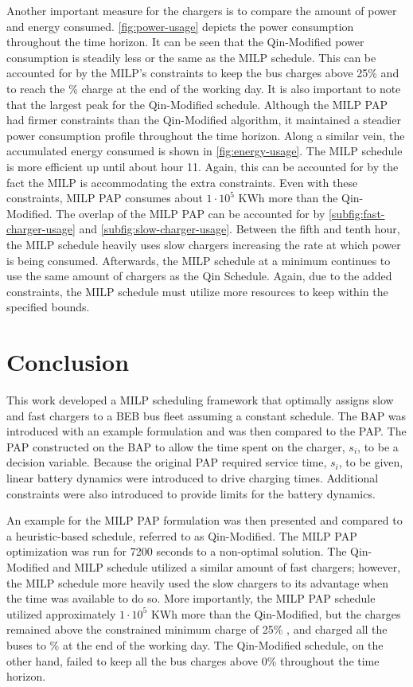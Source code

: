 \documentclass[utf8]{FrontiersinHarvard}
\newcommand{\bcharge}{0.7 }                                                     %
\newcommand{\mincharge}{25\% }                                                  %
\newcommand{\timeran}{7200 }                                                    %
\begin{document}
Another important measure for the chargers is to compare the amount of power and energy consumed.
\autoref{fig:power-usage} depicts the power consumption throughout the time horizon. It can be seen that the
Qin-Modified power consumption is steadily less or the same as the MILP schedule. This can be accounted for by the
MILP's constraints to keep the bus charges above \mincharge and to reach the \fpeval{\bcharge *100}\% charge at the end
of the working day. It is also important to note that the largest peak for the Qin-Modified schedule. Although the MILP
PAP had firmer constraints than the Qin-Modified algorithm, it maintained a steadier power consumption profile
throughout the time horizon. Along a similar vein, the accumulated energy consumed is shown in
\autoref{fig:energy-usage}. The MILP schedule is more efficient up until about hour 11. Again, this can be accounted for
by the fact the MILP is accommodating the extra constraints. Even with these constraints, MILP PAP consumes about
\(1\cdot10^5\) KWh more than the Qin-Modified. The overlap of the MILP PAP can be accounted for by
\autoref{subfig:fast-charger-usage} and \autoref{subfig:slow-charger-usage}. Between the fifth and tenth hour, the MILP
schedule heavily uses slow chargers increasing the rate at which power is being consumed. Afterwards, the MILP schedule
at a minimum continues to use the same amount of chargers as the Qin Schedule. Again, due to the added constraints, the
MILP schedule must utilize more resources to keep within the specified bounds.
\section{Conclusion}
\label{sec:conclusion}
This work developed a MILP scheduling framework that optimally assigns slow and fast chargers to a BEB bus fleet
assuming a constant schedule. The BAP was introduced with an example formulation and was then compared to the PAP. The
PAP constructed on the BAP to allow the time spent on the charger, \(s_i\), to be a decision variable. Because the
original PAP required service time, \(s_i\), to be given, linear battery dynamics were introduced to drive charging times.
Additional constraints were also introduced to provide limits for the battery dynamics.

An example for the MILP PAP formulation was then presented and compared to a heuristic-based schedule, referred to as
Qin-Modified. The MILP PAP optimization was run for \timeran seconds to a non-optimal solution. The Qin-Modified and
MILP schedule utilized a similar amount of fast chargers; however, the MILP schedule more heavily used the slow chargers
to its advantage when the time was available to do so. More importantly, the MILP PAP schedule utilized approximately
\(1\cdot10^5\) KWh more than the Qin-Modified, but the charges remained above the constrained minimum charge of \mincharge,
and charged all the buses to \fpeval{\bcharge *100}\% at the end of the working day. The Qin-Modified schedule, on the
other hand, failed to keep all the bus charges above 0\% throughout the time horizon.
\end{document}
